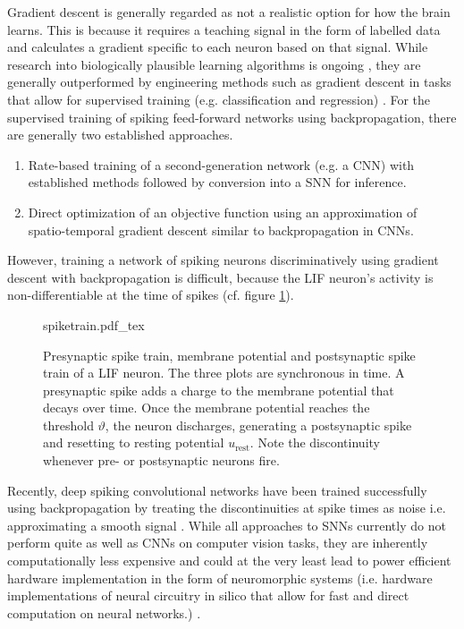 Gradient descent is generally regarded as not a realistic option for how the brain learns. This is because it requires a teaching signal in the form of labelled data and calculates a gradient specific to each neuron based on that signal. While research into biologically plausible learning algorithms is ongoing \cite{bing2018survey,bartunov2018assessing}, they are generally outperformed by engineering methods such as gradient descent in tasks that allow for supervised training (e.g. classification and regression) \cite{diehl2015unsupervised}.
For the supervised training of spiking feed-forward networks using backpropagation, there are generally two established approaches.
\begin{enumerate}
    \item Rate-based training of a second-generation network (e.g. a CNN) with established methods followed by conversion into a SNN for inference.
    \item Direct optimization of an objective function using an approximation of spatio-temporal gradient descent similar to backpropagation in CNNs.
\end{enumerate}
However, training a network of spiking neurons discriminatively using gradient descent with backpropagation is difficult, because the LIF neuron's activity is non-differentiable at the time of spikes (cf. figure \ref{fig:spiketrain}).
\begin{figure}[H]
    \centering
\def\svgwidth{\textwidth}
{spiketrain.pdf_tex}
\caption[Presynaptic spike train, membrane potential and postsynaptic spike train of a LIF neuron]{Presynaptic spike train, membrane potential and postsynaptic spike train of a LIF neuron. The three plots are synchronous in time. A presynaptic spike adds a charge to the membrane potential that decays over time. Once the membrane potential reaches the threshold $\vartheta$, the neuron discharges, generating a postsynaptic spike and resetting to resting potential $u_\mathrm{rest}$. Note the discontinuity whenever pre- or postsynaptic neurons fire.}\label{fig:spiketrain}
\end{figure}\noindent
Recently, deep spiking convolutional networks have been trained successfully using backpropagation by treating the discontinuities at spike times as noise i.e. approximating a smooth signal \cite{10.3389/fnins.2016.00508, panda2016unsupervised}. While all approaches to SNNs currently do not perform quite as well as CNNs on computer vision tasks, they are inherently computationally less expensive and could at the very least lead to power efficient hardware implementation in the form of neuromorphic systems (i.e. hardware implementations of neural circuitry in silico that allow for fast and direct computation on neural networks.) \cite{hopkins2018spiking}.
